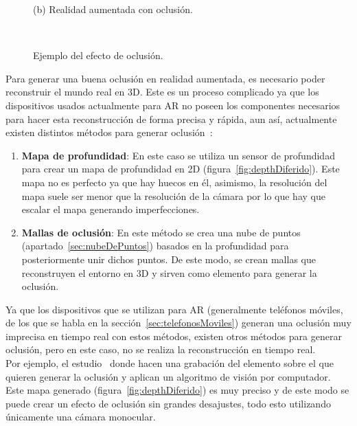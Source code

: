 \begin{figure}[H]
\begin{minipage}{0.5\textwidth}
        (b) Realidad aumentada con oclusión.
    \end{minipage}\\
    \caption[Ejemplo del efecto de oclusión.]{Ejemplo del efecto de oclusión\footnotemark.}
    \label{fig:arcoreOclusionExample}
\end{figure}

Para generar una buena oclusión en realidad aumentada, es necesario poder reconstruir el mundo real en 3D. Este es un proceso complicado ya que los dispositivos usados actualmente para AR no poseen los componentes necesarios para hacer esta reconstrucción de forma precisa y rápida, aun así, actualmente existen distintos métodos para generar oclusión~\cite{oclusionMethods}:

\begin{enumerate}
    \item \textbf{Mapa de profundidad}: En este caso se utiliza un sensor de profundidad para crear un mapa de profundidad en 2D (figura~\ref{fig:depthDiferido}). Este mapa no es perfecto ya que hay huecos en él, asimismo, la resolución del mapa suele ser menor que la resolución de la cámara por lo que hay que escalar el mapa generando imperfecciones.
    
    \item \textbf{Mallas de oclusión}: En este método se crea una nube de puntos (apartado~\ref{sec:nubeDePuntos}) basados en la profundidad para posteriormente unir dichos puntos. De este modo, se crean mallas que reconstruyen el entorno en 3D y sirven como elemento para generar la oclusión.
\end{enumerate}

Ya que los dispositivos que se utilizan para AR (generalmente teléfonos móviles, de los que se habla en la sección~\ref{sec:telefonosMoviles}) generan una oclusión muy imprecisa en tiempo real con estos métodos, existen otros métodos para generar oclusión, pero en este caso, no se realiza la reconstrucción en tiempo real.\\



Por ejemplo, el estudio~\cite{oclusionEnDiferido} donde hacen una grabación del elemento sobre el que quieren generar la oclusión y aplican un algoritmo de visión por computador. Este mapa generado (figura~\ref{fig:depthDiferido}) es muy preciso y de este modo se puede crear un efecto de oclusión sin grandes desajustes, todo esto utilizando únicamente una cámara monocular.\\

